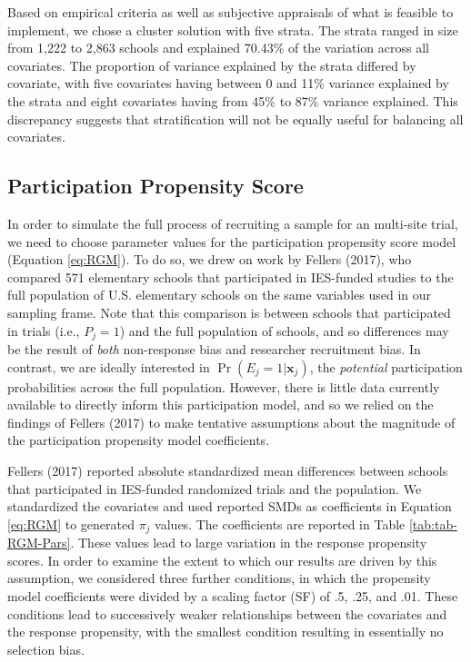 \documentclass[
  english,
  man,floatsintext]{apa6}
\begin{document}
Based on empirical criteria as well as subjective appraisals of what is feasible to implement, we chose a cluster solution with five strata.
The strata ranged in size from 1,222 to 2,863 schools and explained 70.43\% of the variation across all covariates. The proportion of variance explained by the strata differed by covariate, with five covariates having between 0 and 11\% variance explained by the strata and eight covariates having from 45\% to 87\% variance explained. This discrepancy suggests that stratification will not be equally useful for balancing all covariates.

\hypertarget{participation-propensity-score}{%
\subsection{Participation Propensity Score}\label{participation-propensity-score}}

In order to simulate the full process of recruiting a sample for an multi-site trial, we need to choose parameter values for the participation propensity score model (Equation \eqref{eq:RGM}).
To do so, we drew on work by Fellers (2017), who compared 571 elementary schools that participated in IES-funded studies to the full population of U.S. elementary schools on the same variables used in our sampling frame.
Note that this comparison is between schools that participated in trials (i.e., \(P_j = 1\)) and the full population of schools, and so differences may be the result of \emph{both} non-response bias and researcher recruitment bias.
In contrast, we are ideally interested in \(\Pr(E_j = 1 | \mathbf{x}_j)\), the \emph{potential} participation probabilities across the full population.
However, there is little data currently available to directly inform this participation model, and so we relied on the findings of Fellers (2017) to make tentative assumptions about the magnitude of the participation propensity model coefficients.

Fellers (2017) reported absolute standardized mean differences between schools that participated in IES-funded randomized trials and the population. We standardized the covariates and used reported SMDs as coefficients in Equation \eqref{eq:RGM} to generated \(\pi_j\) values. The coefficients are reported in Table \ref{tab:tab-RGM-Pars}.
These values lead to large variation in the response propensity scores. In order to examine the extent to which our results are driven by this assumption, we considered three further conditions, in which the propensity model coefficients were divided by a scaling factor (SF) of .5, .25, and .01.
These conditions lead to successively weaker relationships between the covariates and the response propensity, with the smallest condition resulting in essentially no selection bias.
\end{document}
